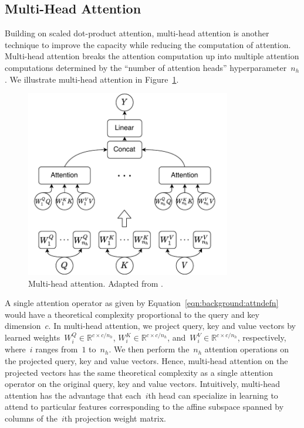 \subsection{Multi-Head Attention}

Building on scaled dot-product attention, multi-head attention is another
technique to improve the capacity while reducing the computation of attention.
Multi-head attention breaks the attention computation up into multiple
attention computations determined by the ``number of attention heads''
hyperparameter~$n_h$.
We illustrate multi-head attention in Figure~\ref{fig:background:multiheadattn}.

\begin{figure}
\centering
\includegraphics[width=0.8\textwidth]{Figures/multihead-attention.pdf}
\caption{Multi-head attention.
         Adapted from \citet{vaswani2017attention}.}
\label{fig:background:multiheadattn}
\end{figure}

A single attention operator as given by Equation~\ref{eqn:background:attndefn}
would have a theoretical complexity proportional to the query and key
dimension~$c$.
In multi-head attention, we project query, key and value vectors by learned
weights~$W^Q_i \in \mathbb{R}^{c\times c/n_h}$,
$W^K_i \in \mathbb{R}^{c\times c/n_h}$,
and~$W^V_i \in \mathbb{R}^{c\times c/n_h}$, respectively, where~$i$
ranges from~$1$ to~$n_h$.
We then perform the~$n_h$ attention operations on the projected query, key and
value vectors.
Hence, multi-head attention on the projected vectors has the same theoretical
complexity as a single attention operator on the original query, key and value
vectors.
Intuitively, multi-head attention has the advantage that each~$i$th head can
specialize in learning to attend to particular features corresponding to the
affine subspace spanned by columns of the~$i$th projection weight matrix.

